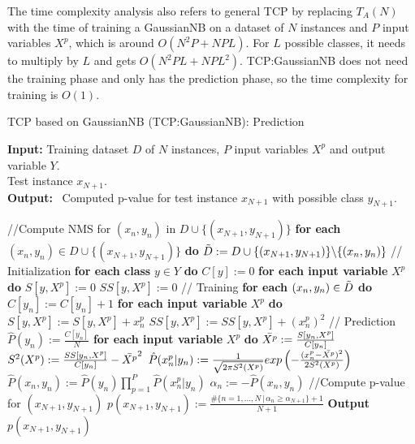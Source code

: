 \documentclass[10pt]{reportMaster}
\begin{document}
\noindent The time complexity analysis also refers to general TCP by replacing $T_A(N)$ with the time of training a GaussianNB on a dataset of $N$ instances and $P$ input variables $X^p$, which is around $O(N^2P+NPL)$. For $L$ possible classes, it needs to multiply by $L$ and gets $O(N^2PL+NPL^2)$. TCP:GaussianNB does not need the training phase and only has the prediction phase, so the time complexity for training is $O(1)$.

\begin{algorithm}[H]
\caption{TCP based on GaussianNB (TCP:GaussianNB): Prediction}\label{alg:TCPG}
\textbf{Input:} \; \; Training dataset $D$ of $N$ instances, $P$ input variables $X^p$ and output variable $Y$.\\
\hspace*{\algorithmicindent} \quad \quad \; \; Test instance $x_{N+1}$.\\
\textbf{Output:} \, Computed p-value for test instance $x_{N+1}$ with possible class $y_{N+1}$.

\begin{algorithmic}[1]
\State //Compute NMS for $ (x_n, y_n)$ in $D \cup \{(x_{N+1},y_{N+1})\}$
\State \textbf{for each} $(x_n,y_n) \in D \cup \{(x_{N+1},y_{N+1})\}$ \textbf{do}
\State \qquad $\Tilde{D}:= D \cup \{(x_{N+1},y_{N+1})\} \backslash \{(x_n,y_n)\}$
\State \qquad // Initialization
\State \qquad \textbf{for each class} $y \in Y$ \textbf{do}
\State \qquad \qquad $C[y] := 0$
\State \qquad \qquad \textbf{for each input variable} $X^p$ \textbf{do}
\State \qquad \qquad \qquad $S[y,X^p] := 0$
\State \qquad \qquad \qquad $SS[y,X^p] := 0$
\State \qquad // Training
\State \qquad \textbf{for each} $(x_n,y_n) \in \Tilde{D}$ \textbf{do}
\State \qquad \qquad $C[y_n] := C[y_n]+1$
\State \qquad \qquad \textbf{for each input variable} $X^p$ \textbf{do}
\State \qquad \qquad \qquad $S[y,X^p] := S[y,X^p] + x_n^p$
\State \qquad \qquad \qquad $SS[y,X^p] := SS[y,X^p] + (x_n^p)^2$
\State \qquad // Prediction
\State \qquad $\hat{P}(y_n) := \frac{C[y_n]}{N}$
\State \qquad \textbf{for each input variable} $X^p$ \textbf{do}
\State \qquad \qquad $\Bar{X^p}:=\frac{S[y_n,X^p]}{C[y_n]}$
\State \qquad \qquad $S^2(X^p):=\frac{SS[y_n,X^p]}{C[y_n]}-\Bar{X^p}^2$
\State \qquad \qquad $\hat{P}(x_n^p|y_n):=\frac{1}{\sqrt{2 \pi S^2(X^p)}}exp\left(-\frac{(x_n^p-\Bar{X^p})^2}{2S^2(X^p)}\right)$
\State \qquad $\hat{P}(x_n,y_n):=\hat{P}(y_n) \prod_{p=1}^P \hat{P}(x_n^p|y_n)$
\State \qquad $\alpha_n := -\hat{P}(x_n,y_n)$
\State //Compute p-value for $(x_{N+1},y_{N+1})$
\State $p(x_{N+1},y_{N+1}):=\frac{\#\{n=1,...,N \,|\, \alpha_n \geq \alpha_{N+1}\}+1}{N+1}$
\State \textbf{Output} $p(x_{N+1},y_{N+1})$
\end{algorithmic}
\end{algorithm}
\end{document}
